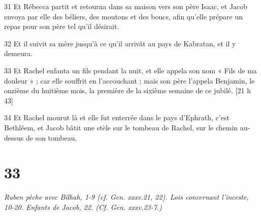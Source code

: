 \par 31 Et Rébecca partit et retourna dans sa maison vers son père Isaac, et Jacob envoya par elle des béliers, des moutons et des boucs, afin qu'elle prépare un repas pour son père tel qu'il désirait.
\par 32 Et il suivit sa mère jusqu'à ce qu'il arrivât au pays de Kabratan, et il y demeura.
\par 33 Et Rachel enfanta un fils pendant la nuit, et elle appela son nom « Fils de ma douleur » ; car elle souffrit en l'accouchant ; mais son père l'appela Benjamin, le onzième du huitième mois, la première de la sixième semaine de ce jubilé. [21 h 43]
\par 34 Et Rachel mourut là et elle fut enterrée dans le pays d'Ephrath, c'est Bethléem, et Jacob bâtit une stèle sur le tombeau de Rachel, sur le chemin au-dessus de son tombeau.

\chapter{33}

\par \textit{Ruben pèche avec Bilhah, 1-9 (cf. Gen. xxxv.21, 22). Lois concernant l'inceste, 10-20. Enfants de Jacob, 22. (Cf. Gen. xxxv.23-7.)}

